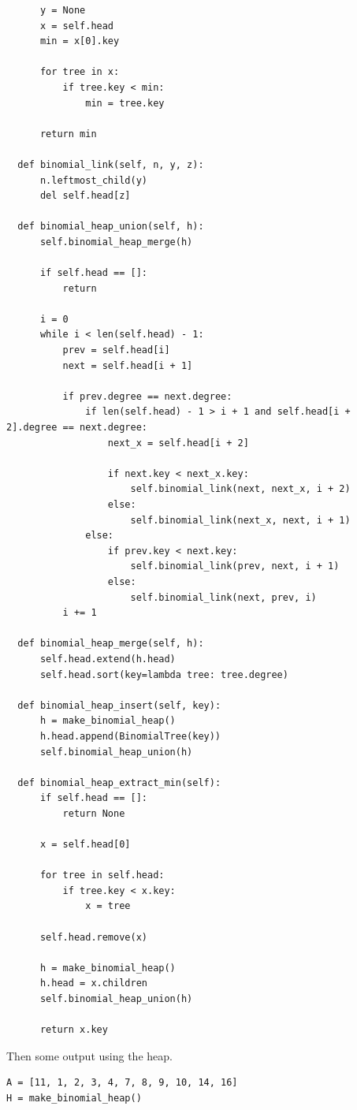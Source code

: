 \documentclass{article}
\begin{document}
\begin{enumerate}
\begin{enumerate}
\begin{lstlisting}
      y = None
      x = self.head
      min = x[0].key

      for tree in x:
          if tree.key < min:
              min = tree.key                
      
      return min

  def binomial_link(self, n, y, z):
      n.leftmost_child(y)
      del self.head[z]        

  def binomial_heap_union(self, h):
      self.binomial_heap_merge(h)
      
      if self.head == []:
          return
      
      i = 0
      while i < len(self.head) - 1:
          prev = self.head[i]
          next = self.head[i + 1]

          if prev.degree == next.degree:
              if len(self.head) - 1 > i + 1 and self.head[i + 2].degree == next.degree:                    
                  next_x = self.head[i + 2]
                  
                  if next.key < next_x.key:
                      self.binomial_link(next, next_x, i + 2)
                  else:
                      self.binomial_link(next_x, next, i + 1)
              else:
                  if prev.key < next.key:
                      self.binomial_link(prev, next, i + 1)
                  else:
                      self.binomial_link(next, prev, i)            
          i += 1

  def binomial_heap_merge(self, h):
      self.head.extend(h.head)
      self.head.sort(key=lambda tree: tree.degree)

  def binomial_heap_insert(self, key):
      h = make_binomial_heap()
      h.head.append(BinomialTree(key))
      self.binomial_heap_union(h)        

  def binomial_heap_extract_min(self):
      if self.head == []:
          return None

      x = self.head[0]
      
      for tree in self.head:
          if tree.key < x.key:
              x = tree
      
      self.head.remove(x)
      
      h = make_binomial_heap()
      h.head = x.children
      self.binomial_heap_union(h)

      return x.key      
    \end{lstlisting}

    Then some output using the heap.

    \begin{lstlisting}
A = [11, 1, 2, 3, 4, 7, 8, 9, 10, 14, 16]
H = make_binomial_heap()


\end{lstlisting}
\end{enumerate}
\end{enumerate}
\end{document}
